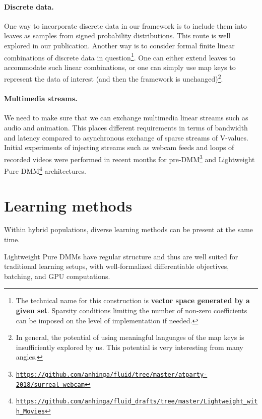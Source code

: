 \documentclass{article}
\begin{document}
\paragraph{Discrete data.} One way to incorporate discrete data in our framework is to include them into leaves as samples from signed
probability distributions. This route is well explored in our publication. Another way is to consider formal finite linear combinations of
discrete data in question\footnote{The technical name for this construction is {\bf vector space generated by a given set}. Sparsity conditions
limiting the number of non-zero coefficients can be imposed on the level of implementation if needed.}. 
One can either extend leaves to accommodate such linear combinations, or one can simply use map keys
to represent the data of interest (and then the framework is unchanged)\footnote{In general, the potential of using meaningful
languages of the map keys is insufficiently explored by us. This potential is very interesting from many angles.}.

\paragraph{Multimedia streams.}We need to make sure that we can exchange multimedia linear streams such as audio and animation.
This places different requirements in terms of bandwidth and latency compared to asynchronous exchange of sparse streams of
V-values. Initial experiments of injecting streams such as webcam feeds and loops of recorded videos were performed in recent months
for pre-DMM\footnote{\href{https://github.com/anhinga/fluid/tree/master/atparty-2018/surreal\_webcam}
{\tt https://github.com/anhinga/fluid/tree/master/atparty-2018/surreal\_webcam}} and Lightweight Pure 
DMM\footnote{\href{https://github.com/anhinga/fluid\_drafts/tree/master/Lightweight\_with\_Movies}
{\tt https://github.com/anhinga/fluid\_drafts/tree/master/Lightweight\_with\_Movies}} architectures.



\section{Learning methods}\label{sec:learning}

Within hybrid populations, diverse learning methods can be present at the same time.

Lightweight Pure DMMs have regular structure and thus are well suited for traditional learning setups, with well-formalized differentiable objectives,
batching, and GPU computations.
\end{document}
